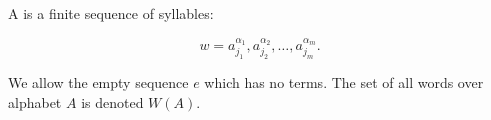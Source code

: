 A  is a finite sequence of syllables:

$$w = a_{j_1}^{\alpha_1}, a_{j_2}^{\alpha_2}, \ldots, a_{j_m}^{\alpha_m}.$$

We allow the empty sequence $e$ which has no terms. The set of all words over alphabet $A$ is denoted $W(A)$.
